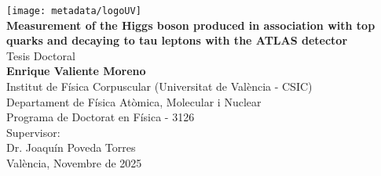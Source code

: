 \begin{titlepage}
    \begin{center}
        \vspace*{1cm} 
        \texttt{[image: metadata/logoUV]}\\[15mm]

        {\Large{\textbf{Measurement of the Higgs boson produced in association with top quarks and decaying to tau leptons with the ATLAS detector}}}\\[15mm]

        Tesis Doctoral\\
        {\large{\textbf{Enrique Valiente Moreno}}}\\[15mm]

        Institut de Física Corpuscular (Universitat de València - CSIC)\\
        Departament de Física Atòmica, Molecular i Nuclear\\
        Programa de Doctorat en Física - 3126\\[15mm]

        Supervisor:\\
        Dr. Joaquín Poveda Torres\\[15mm]

        València, Novembre de 2025
    \end{center}

\end{titlepage}